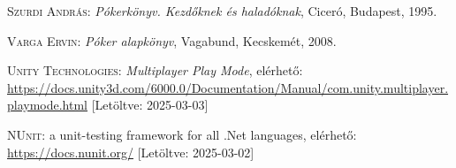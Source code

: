 \documentclass[]{thesis-ekf}
\theoremstyle{definition}
\theoremstyle{remark}
\begin{document}
\begin{thebibliography}{2}
	\textsc{Szurdi András}: \emph{Pókerkönyv. Kezdőknek és haladóknak}, Ciceró, Budapest, 1995.
	
	\textsc{Varga Ervin}: \emph{Póker alapkönyv}, Vagabund, Kecskemét, 2008.
	
	\textsc{Unity Technologies}: \emph{Multiplayer Play Mode}, elérhető:
	\url{https://docs.unity3d.com/6000.0/Documentation/Manual/com.unity.multiplayer.playmode.html} [Letöltve: 2025-03-03]
	
	\textsc{NUnit}: a unit-testing framework for all .Net languages, elérhető: \url{https://docs.nunit.org/} [Letöltve: 2025-03-02]
	
\end{thebibliography}

%
\end{document}
